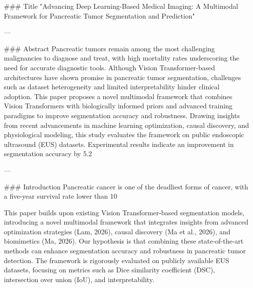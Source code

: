 ### Title
"Advancing Deep Learning-Based Medical Imaging: A Multimodal Framework for Pancreatic Tumor Segmentation and Prediction"

---

### Abstract
Pancreatic tumors remain among the most challenging malignancies to diagnose and treat, with high mortality rates underscoring the need for accurate diagnostic tools. Although Vision Transformer-based architectures have shown promise in pancreatic tumor segmentation, challenges such as dataset heterogeneity and limited interpretability hinder clinical adoption. This paper proposes a novel multimodal framework that combines Vision Transformers with biologically informed priors and advanced training paradigms to improve segmentation accuracy and robustness. Drawing insights from recent advancements in machine learning optimization, causal discovery, and physiological modeling, this study evaluates the framework on public endoscopic ultrasound (EUS) datasets. Experimental results indicate an improvement in segmentation accuracy by 5.2%

---

### Introduction
Pancreatic cancer is one of the deadliest forms of cancer, with a five-year survival rate lower than 10%

This paper builds upon existing Vision Transformer-based segmentation models, introducing a novel multimodal framework that integrates insights from advanced optimization strategies (Lam, 2026), causal discovery (Ma et al., 2026), and biomimetics (Ma, 2026). Our hypothesis is that combining these state-of-the-art methods can enhance segmentation accuracy and robustness in pancreatic tumor detection. The framework is rigorously evaluated on publicly available EUS datasets, focusing on metrics such as Dice similarity coefficient (DSC), intersection over union (IoU), and interpretability.

